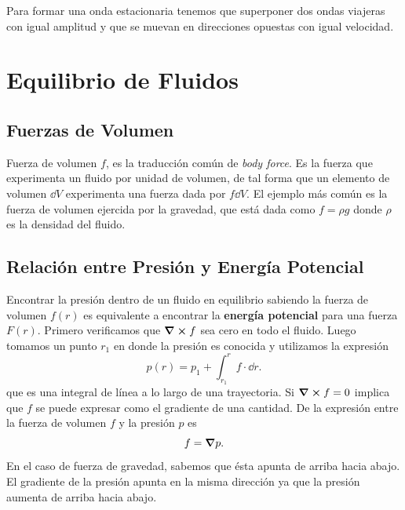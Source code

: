 \begin{tcolorbox}
	Para formar una onda estacionaria tenemos que superponer dos ondas
viajeras con igual amplitud y que se muevan en direcciones opuestas con
igual velocidad. 
\end{tcolorbox}


\section{Equilibrio de Fluidos}
\subsection{Fuerzas de Volumen}
Fuerza de volumen $f$, es la traducción común de \textit{body force}. Es la fuerza que experimenta un fluido por unidad de volumen, de tal forma que un elemento de volumen $\dd{V}$ experimenta una fuerza dada por $f\dd{V}$. El ejemplo más común es la fuerza de volumen ejercida por la gravedad, que está dada como $f = \rho g$ donde $\rho$ es la densidad del fluido.

\subsection{Relación entre Presión y Energía Potencial}
Encontrar la presión dentro de un fluido en equilibrio sabiendo la fuerza de volumen $f(r)$ es equivalente a encontrar la \textbf{energía potencial} para una fuerza $F(r)$. Primero verificamos que  $\curl{f}$ sea cero en todo el fluido. Luego tomamos un punto  $r_1$ en donde la presión es conocida y utilizamos la expresión
	\begin{equation}
		p(r) = p_1 + \int _{r_1} ^r f\cdot \dd{r}.
	\end{equation}
que es una integral de línea a lo largo de una trayectoria. Si $\curl{f} = 0$ implica que $f$ se puede expresar como el gradiente de una cantidad. De la expresión entre la fuerza de volumen $f$ y la presión $p$ es
	$$ f = \grad{p}. $$
En el caso de fuerza de gravedad, sabemos que ésta apunta de arriba hacia abajo. El gradiente de la presión apunta en la misma dirección ya que la presión aumenta de arriba hacia abajo.



